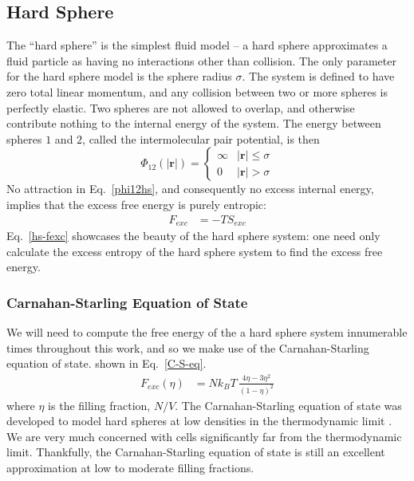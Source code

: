 \documentclass[12pt]{article}
\renewcommand{\vec}[1]{\mathbf{#1}}
\begin{document}
\subsection{Hard Sphere}
The ``hard sphere'' is the simplest fluid model -- a hard sphere approximates a fluid particle as having no interactions other than collision. The only parameter for the hard sphere model is the sphere radius $\sigma$. The system is defined to have zero total linear momentum, and any collision between two or more spheres is perfectly elastic. Two spheres are not allowed to overlap, and otherwise contribute nothing to the internal energy of the system. The energy between spheres $1$ and $2$, called the intermolecular pair potential, is then
\begin{equation} 
    \Phi_{12}(|\vec{r}|) = \begin{cases}\infty & |\vec{r}|\leq \sigma\\ 0 & |\vec{r}| > \sigma \end{cases}
\label{phi12hs}
\end{equation}
No attraction in Eq.~\ref{phi12hs}, and consequently no excess internal energy, implies that the excess free energy is purely entropic: 
\begin{align}
    F_{exc} &= -T S_{exc}
    \label{hs-fexc}
\end{align}
Eq.~\ref{hs-fexc} showcases the beauty of the hard sphere system: one need only calculate the excess entropy of the hard sphere system to find the excess free energy.
\subsubsection{Carnahan-Starling Equation of State}
We will need to compute the free energy of the a hard sphere system innumerable times throughout this work, and so we make use of the Carnahan-Starling equation of state. shown in Eq.~\ref{C-S-eq}.
\begin{align}
    F_{exc}(\eta) &= N k_B T\,\frac{4\eta - 3\eta^2}{(1-\eta)^2}
    \label{C-S-eq}  
\end{align} 
where $\eta$ is the filling fraction, $N/V$. The Carnahan-Starling equation of state was developed to model hard spheres at low densities in the thermodynamic limit \cite{cseos}. We are very much concerned with cells significantly far from the thermodynamic limit. Thankfully, the Carnahan-Starling equation of state is still an excellent approximation at low to moderate filling fractions.\\ 
\end{document}
